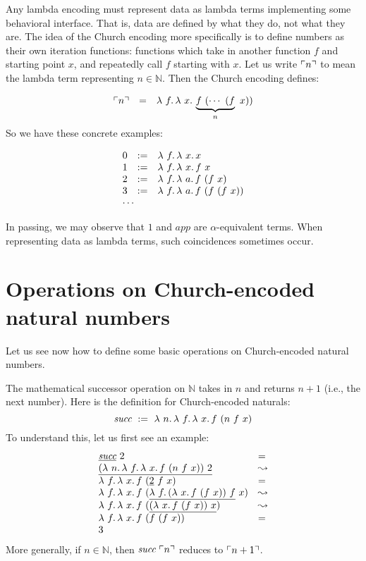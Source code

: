 Any lambda encoding must represent data as lambda terms implementing
some behavioral interface.  That is, data are defined by what they do,
not what they are.  The idea of the Church encoding more specifically
is to define numbers as their own iteration functions: functions which
take in another function $f$ and starting point $x$, and repeatedly
call $f$ starting with $x$.  Let us write $\ulcorner n \urcorner$ to mean the lambda
term representing $n\in\mathbb{N}$.  Then the Church encoding defines:

\[
\begin{array}{lll}
  \rep{n} & = & \lam{f}{\lam{x}{\underbrace{f \ (\cdots\  (f}_{n}\ x))}}
\end{array}
\]
\noindent So we have these concrete examples:

\[
\begin{array}{lll}
  0 & := & \lam{f}{\lam{x}{x}} \\
  1 & := & \lam{f}{\lam{x}{f\ x}} \\
  2 & := & \lam{f}{\lam{a}{f\ (f\ x)}} \\
  3 & := & \lam{f}{\lam{a}{f\ (f\ (f\ x))}} \\  
  \multicolumn{3}{l}{\cdots}
\end{array}
\]

\noindent In passing, we may observe that $1$ and $\textit{app}$ are $\alpha$-equivalent
terms.  When representing data as lambda terms, such coincidences
sometimes occur.

\section{Operations on Church-encoded natural numbers}

Let us see now how to define some basic operations on Church-encoded
natural numbers.

 The mathematical successor
operation on $\mathbb{N}$ takes in $n$
and returns $n+1$ (i.e., the next number).  Here is the definition for
Church-encoded naturals:
\[
\textit{succ}\ :=\ \lam{n}{\lam{f}{\lam{x}{f\ (n\ f\ x)}}}
\]
\noindent To understand this, let us first see an example:
\[
\begin{array}{ll}
  \underline{\textit{succ}}\ 2 & = \\
  \underline{(\lambda\ n.\, \lambda\ f.\, \lambda\ x.\, f\ (n\ f\ x))\ 2} & \leadsto \\
  \lambda\ f.\, \lambda\ x.\, f\ (\underline{2}\ f\ x) & = \\
  \lambda\ f.\, \lambda\ x.\, f\ (\underline{\lambda\ f.\, (\lambda\ x.\, f\ (f\ x))\ f}\ x) & \leadsto \\
  \lambda\ f.\, \lambda\ x.\, f\ (\underline{(\lambda\ x.\, f\ (f\ x))\ x}) & \leadsto \\
  \lambda\ f.\, \lambda\ x.\, f\ (f\ (f\ x)) & = \\
  3
\end{array}
\]
More generally, if $n\in\mathbb{N}$, then $\textit{succ}\ \ulcorner n \urcorner$ reduces to $\ulcorner n+1 \urcorner$.

